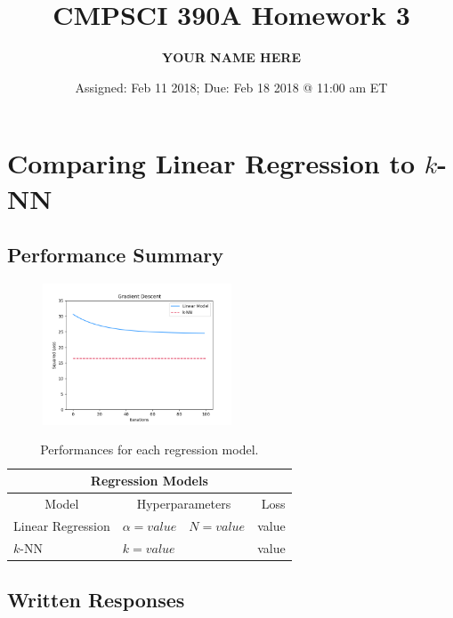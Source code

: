 \documentclass{article}
\title{CMPSCI 390A Homework 3}
\author{\textbf{YOUR NAME HERE}}
\date{Assigned: Feb 11 2018; Due: Feb 18 2018 @ 11:00 am ET}
\begin{document}
\maketitle




\section{Comparing Linear Regression to $k$-NN}

\subsection{Performance Summary}

\begin{figure}[h]
    \centering
    \includegraphics[width=0.5\textwidth]{images/learning_curve.png}
    \label{fig:learning_curve}
\end{figure}

\begin{table}[h]
\centering
\begin{tabular}{lllr}
\hline
\multicolumn{4}{c}{Regression Models}                                   \\ \hline
\multicolumn{1}{c}{Model} & \multicolumn{2}{c}{Hyperparameters} & Loss  \\ \hline
Linear Regression         & $\alpha = {value}$     & $N = {value}$    & {value} \\
$k$-NN                      & \multicolumn{2}{l}{$k = {value}$}       & {value} \\
\hline
\end{tabular}
\caption{Performances for each regression model.}
\label{tab:my-table}
\end{table}

\newpage
\subsection{Written Responses}
\end{document}
